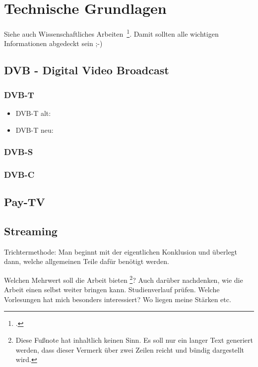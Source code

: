\newpage
\section{Technische Grundlagen}

Siehe auch Wissenschaftliches Arbeiten~\footcite[Vgl. ][Seite 1]{Balzert.2008}. Damit sollten alle wichtigen Informationen abgedeckt sein ;-)

\subsection{DVB - Digital Video Broadcast}
\subsubsection{DVB-T}
\begin{itemize}
\item DVB-T alt:
\item DVB-T neu:
\end{itemize}
\subsubsection{DVB-S}
\subsubsection{DVB-C}

\subsection{Pay-TV}

\subsection{Streaming}
Trichtermethode: Man beginnt mit der eigentlichen  Konklusion und überlegt dann, welche allgemeinen Teile dafür benötigt werden.

Welchen Mehrwert soll die Arbeit bieten \footnote{Diese Fußnote hat inhaltlich keinen Sinn. Es soll nur ein langer Text generiert werden, dass dieser Vermerk über zwei Zeilen reicht und bündig dargestellt wird.}? Auch darüber nachdenken, wie die Arbeit einen selbst weiter bringen kann. Studienverlauf prüfen. Welche Vorlesungen hat mich besonders interessiert? Wo liegen meine Stärken etc.

